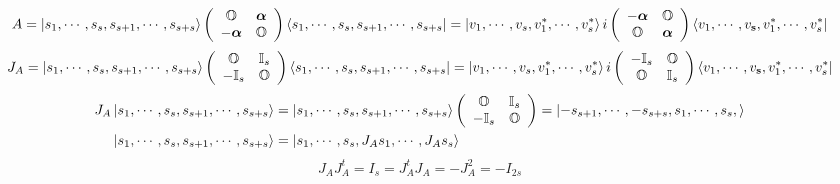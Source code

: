 \documentclass[aps,preprint]{revtex4}%
\begin{document}
\begin{equation}
A=\left\vert s_{1},\cdots,s_{s},s_{s+1},\cdots,s_{s+s}\right\rangle \left(
\begin{array}
[c]{cc}%
\mathbb{O} & \boldsymbol{\alpha}\\
-\boldsymbol{\alpha} & \mathbb{O}%
\end{array}
\right)  \left\langle s_{1},\cdots,s_{s},s_{s+1},\cdots,s_{s+s}\right\vert
=\left\vert v_{1},\cdots,v_{s},v_{1}^{\ast},\cdots,v_{s}^{\ast}\right\rangle
i\left(
\begin{array}
[c]{cc}%
-\boldsymbol{\alpha} & \mathbb{O}\\
\mathbb{O} & \boldsymbol{\alpha}%
\end{array}
\right)  \left\langle v_{1},\cdots,v_{\mathbf{s}},v_{1}^{\ast},\cdots
,v_{s}^{\ast}\right\vert
\end{equation}%
\begin{equation}
J_{A}=\left\vert s_{1},\cdots,s_{s},s_{s+1},\cdots,s_{s+s}\right\rangle
\left(
\begin{array}
[c]{cc}%
\mathbb{O} & \mathbb{I}_{s}\\
-\mathbb{I}_{s} & \mathbb{O}%
\end{array}
\right)  \left\langle s_{1},\cdots,s_{s},s_{s+1},\cdots,s_{s+s}\right\vert
=\left\vert v_{1},\cdots,v_{s},v_{1}^{\ast},\cdots,v_{s}^{\ast}\right\rangle
i\left(
\begin{array}
[c]{cc}%
-\mathbb{I}_{s} & \mathbb{O}\\
\mathbb{O} & \mathbb{I}_{s}%
\end{array}
\right)  \left\langle v_{1},\cdots,v_{\mathbf{s}},v_{1}^{\ast},\cdots
,v_{s}^{\ast}\right\vert
\end{equation}%
\begin{align}
J_{A}\left\vert s_{1},\cdots,s_{s},s_{s+1},\cdots,s_{s+s}\right\rangle  &
=\left\vert s_{1},\cdots,s_{s},s_{s+1},\cdots,s_{s+s}\right\rangle \left(
\begin{array}
[c]{cc}%
\mathbb{O} & \mathbb{I}_{s}\\
-\mathbb{I}_{s} & \mathbb{O}%
\end{array}
\right)  =\left\vert -s_{s+1},\cdots,-s_{s+s},s_{1},\cdots,s_{s},\right\rangle
\\
\left\vert s_{1},\cdots,s_{s},s_{s+1},\cdots,s_{s+s}\right\rangle  &
=\left\vert s_{1},\cdots,s_{s},J_{A}s_{1},\cdots,J_{A}s_{s}\right\rangle
\end{align}%
\begin{equation}
J_{A}J_{A}^{t}=I_{s}=J_{A}^{t}J_{A}=-J_{A}^{2}=-I_{2s}%
\end{equation}%
\end{document}
